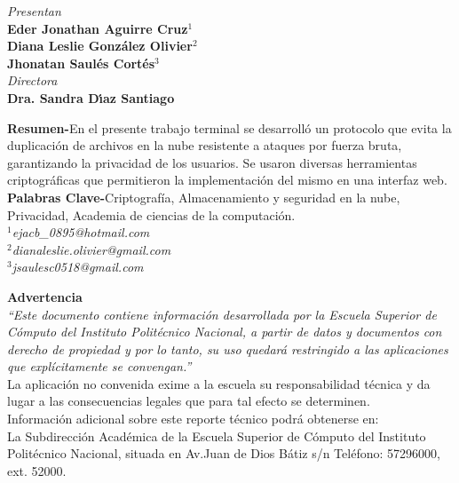 \documentclass[12pt,oneside,onecolumn]{book}
\begin{document}
\begin{titlepage}
{\begin{center}
	    {\fontsize{14}{20} \textit{Presentan}}\\
	    {\fontsize{14}{20} \textbf{Eder Jonathan Aguirre Cruz$^{1}$\\ Diana Leslie González Olivier$^{2}$ \\ \vspace{.2cm} Jhonatan Saulés Cortés$^{3}$ }}\vspace{1cm}\\
	    {\fontsize{14}{20} \textit{Directora}}\\
	    {\fontsize{14}{20} \textbf{Dra. Sandra D\'\i az Santiago}}   \vspace{1cm}
	    \end{center}
	{\fontsize{14}{20}\textbf{Resumen-}En el presente trabajo terminal se desarrolló un protocolo que evita la duplicación de archivos en la nube resistente a ataques por fuerza bruta, garantizando la privacidad de los usuarios. Se usaron diversas herramientas criptográficas que permitieron la implementación del mismo en una interfaz web.}\vspace{1cm}\\
         {\fontsize{14}{20}\textbf{Palabras Clave-}Criptografía, Almacenamiento y seguridad en la nube, Privacidad, Academia de ciencias de la computación.}\vspace{1cm}\\
	{\fontsize{14}{20} \textit{ $^{1}$ejacb\_0895@hotmail.com}}\\
	{\fontsize{14}{20} \textit{ $^{2}$dianaleslie.olivier@gmail.com}}\\
	{\fontsize{14}{20} \textit{ $^{3}$jsaulesc0518@gmail.com}}\\
	    
	}
\end{titlepage}

\newpage
{\fontsize{14}{20} \textbf{Advertencia}}\vspace{2cm}\\
{\fontsize{14}{20} \textit{“Este documento contiene información desarrollada por la Escuela Superior de Cómputo del Instituto Politécnico Nacional, a partir de datos y documentos con derecho de propiedad y por lo tanto, su uso quedará restringido a las aplicaciones que explícitamente se convengan.”}}\vspace{1cm}\\
{\fontsize{14}{20} La aplicación no convenida exime a la escuela su responsabilidad técnica y da lugar a las consecuencias legales que para tal efecto se determinen.}\vspace{1cm}\\
{\fontsize{14}{20} Información adicional sobre este reporte técnico podrá obtenerse en:}\vspace{1cm}\\
{\fontsize{14}{20}La Subdirección Académica de la Escuela Superior de Cómputo del Instituto Politécnico Nacional, situada en Av.Juan de Dios Bátiz s/n Teléfono: 57296000, ext. 52000.}
\end{document}

